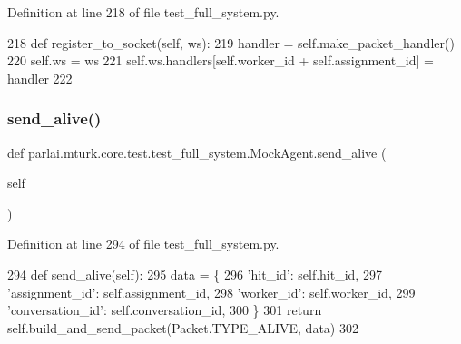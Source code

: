 Definition at line 218 of file test\+\_\+full\+\_\+system.\+py.


\begin{DoxyCode}
218     \textcolor{keyword}{def }register\_to\_socket(self, ws):
219         handler = self.make\_packet\_handler()
220         self.ws = ws
221         self.ws.handlers[self.worker\_id + self.assignment\_id] = handler
222 
\end{DoxyCode}
\mbox{\label{classparlai_1_1mturk_1_1core_1_1test_1_1test__full__system_1_1MockAgent_a7a0ba09a58ea21ac86db4b501c392a33}} 
\subsubsection{\texorpdfstring{send\+\_\+alive()}{send\_alive()}}
{\footnotesize\ttfamily def parlai.\+mturk.\+core.\+test.\+test\+\_\+full\+\_\+system.\+Mock\+Agent.\+send\+\_\+alive (\begin{DoxyParamCaption}\item[{}]{self }\end{DoxyParamCaption})}



Definition at line 294 of file test\+\_\+full\+\_\+system.\+py.


\begin{DoxyCode}
294     \textcolor{keyword}{def }send\_alive(self):
295         data = \{
296             \textcolor{stringliteral}{'hit\_id'}: self.hit\_id,
297             \textcolor{stringliteral}{'assignment\_id'}: self.assignment\_id,
298             \textcolor{stringliteral}{'worker\_id'}: self.worker\_id,
299             \textcolor{stringliteral}{'conversation\_id'}: self.conversation\_id,
300         \}
301         \textcolor{keywordflow}{return} self.build\_and\_send\_packet(Packet.TYPE\_ALIVE, data)
302 
\end{DoxyCode}
\mbox{\label{classparlai_1_1mturk_1_1core_1_1test_1_1test__full__system_1_1MockAgent_a42f7589517cdf4c6a10b9a80e9afea1a}} 

